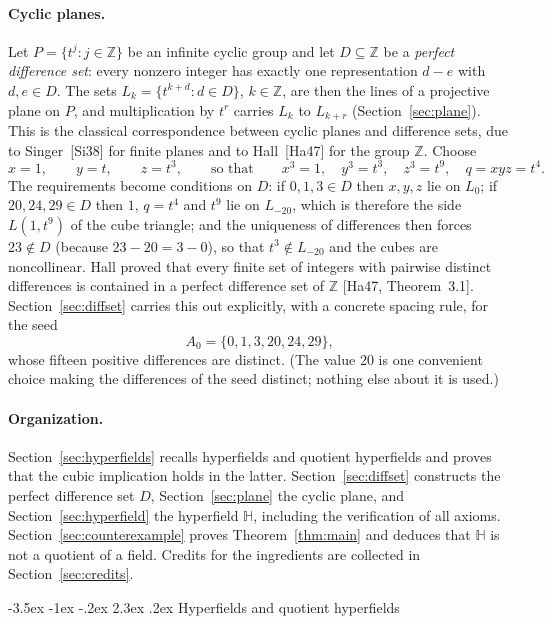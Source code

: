 \documentclass[12pt]{article}
\makeatletter
\renewcommand\section{\@startsection{section}{1}{\z@}%
  {-3.5ex \@plus -1ex \@minus -.2ex}%
  {2.3ex \@plus.2ex}%
  {\normalfont\bfseries}}
\theoremstyle{plain}
\theoremstyle{definition}
\newcommand{\Z}{\mathbb{Z}}
\newcommand{\Hh}{\mathbb{H}}
\makeatother
\begin{document}
\paragraph{Cyclic planes.}
Let $P=\{t^j:j\in\Z\}$ be an infinite cyclic group and let
$D\subseteq\Z$ be a \emph{perfect difference set}: every nonzero
integer has exactly one representation $d-e$ with $d,e\in D$.  The sets
$L_k=\{t^{k+d}:d\in D\}$, $k\in\Z$, are then the lines of a projective
plane on $P$, and multiplication by $t^r$ carries $L_k$ to $L_{k+r}$
(Section~\ref{sec:plane}).  This is the classical correspondence between
cyclic planes and difference sets, due to Singer~[Si38] for finite
planes and to Hall~[Ha47] for the group $\Z$.  Choose
\[
 x=1,\qquad y=t,\qquad z=t^3,\qquad\text{so that}\qquad
 x^3=1,\quad y^3=t^3,\quad z^3=t^9,\quad q=xyz=t^4.
\]
The requirements become conditions on $D$: if $0,1,3\in D$ then $x,y,z$
lie on $L_0$; if $20,24,29\in D$ then $1$, $q=t^4$ and $t^9$ lie on
$L_{-20}$, which is therefore the side $L(1,t^9)$ of the cube triangle;
and the uniqueness of differences then forces $23\notin D$ (because
$23-20=3-0$), so that $t^3\notin L_{-20}$ and the cubes are
noncollinear.  Hall proved that every finite set of integers with
pairwise distinct differences is contained in a perfect difference set
of $\Z$ [Ha47, Theorem~3.1].  Section~\ref{sec:diffset} carries this
out explicitly, with a concrete spacing rule, for the seed
\[
 A_0=\{0,1,3,20,24,29\},
\]
whose fifteen positive differences are distinct.  (The value $20$ is one
convenient choice making the differences of the seed distinct; nothing
else about it is used.)

\paragraph{Organization.}
Section~\ref{sec:hyperfields} recalls hyperfields and quotient
hyperfields and proves that the cubic implication holds in the latter.
Section~\ref{sec:diffset} constructs the perfect difference set $D$,
Section~\ref{sec:plane} the cyclic plane, and
Section~\ref{sec:hyperfield} the hyperfield $\Hh$, including the
verification of all axioms.  Section~\ref{sec:counterexample} proves
Theorem~\ref{thm:main} and deduces that $\Hh$ is not a quotient of a
field.  Credits for the ingredients are collected in
Section~\ref{sec:credits}.

\section{Hyperfields and quotient hyperfields}\label{sec:hyperfields}
\end{document}

